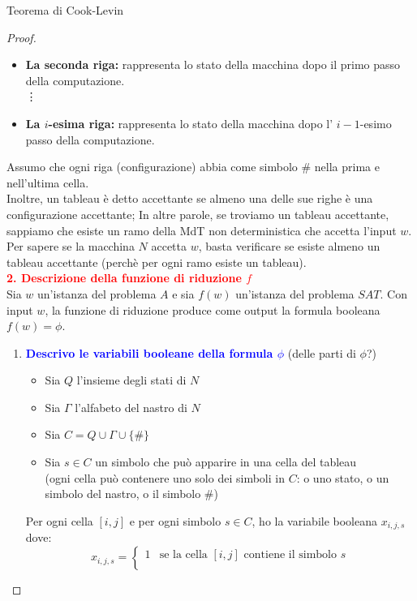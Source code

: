 \documentclass{article}  %
\theoremstyle{definition}
\begin{document}
\begin{theorem}{Teorema di Cook-Levin}
\begin{proof}
\begin{itemize}
			      (\textit{esempio: la macchina parte nello stato iniziale $q_0$ con l'input scritto sul nastro e la testina sulla prima cella dell'input})
			\item \textbf{La seconda riga:} rappresenta lo stato della macchina dopo il primo passo della computazione. \\
			      \vdots
			\item \textbf{La $i$-esima riga:} rappresenta lo stato della macchina dopo l' $i-1$-esimo passo della computazione.
		\end{itemize}
		Assumo che ogni riga (configurazione) abbia come simbolo \# nella prima e nell'ultima cella. \\
		Inoltre, un tableau è detto accettante se almeno una delle sue righe è una configurazione accettante; In altre parole, se troviamo un tableau accettante,
		sappiamo che esiste un ramo della MdT non deterministica che accetta l'input $w$.
		Per sapere se la macchina $N$ accetta $w$, basta verificare se esiste almeno un tableau accettante (perchè per ogni ramo esiste un tableau). \\
		\textcolor{red}{\textbf{2. Descrizione della funzione di riduzione $f$}} \\
		Sia $w$ un'istanza del problema $A$ e sia $f(w)$ un'istanza del problema $SAT$. Con input $w$, la funzione di riduzione produce come output la formula booleana $f(w)=\phi$. \\
		\begin{enumerate}
			\item \textcolor{blue}{\textbf{Descrivo le variabili booleane della formula $\phi$}} (delle parti di $\phi$?)
			      \begin{itemize}
				      \item Sia $Q$ l'insieme degli stati di $N$
				      \item Sia $\Gamma$ l'alfabeto del nastro di $N$
				      \item Sia $C= Q \cup \Gamma \cup \{\#\}$
				      \item Sia $s \in C$ un simbolo che può apparire in una cella del tableau \\ (ogni cella può contenere uno solo dei simboli in $C$:
				            o uno stato, o un simbolo del nastro, o il simbolo \#)
			      \end{itemize}
			      Per ogni cella $[i,j]$ e per ogni simbolo $s \in C$, ho la variabile booleana $x_{i,j,s}$ dove:
			      \[
				      x_{i,j,s} =
				      \begin{cases}
					      1 & \text{se la cella } [i,j] \text{ contiene il simbolo } s \\

\end{cases}\]
\end{enumerate}
\end{proof}
\end{theorem}
\end{document}
